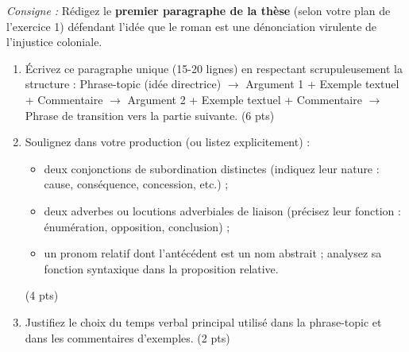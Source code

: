 \documentclass[11pt]{article}
\begin{document}
\begin{exercice}
\emph{Consigne :} Rédigez le \textbf{premier paragraphe de la thèse} (selon votre plan de l'exercice 1) défendant l'idée que le roman est une dénonciation virulente de l'injustice coloniale.

\begin{enumerate}
    \item Écrivez ce paragraphe unique (15-20 lignes) en respectant scrupuleusement la structure : Phrase-topic (idée directrice) $\rightarrow$ Argument 1 + Exemple textuel + Commentaire $\rightarrow$ Argument 2 + Exemple textuel + Commentaire $\rightarrow$ Phrase de transition vers la partie suivante. (6 pts)
    \item Soulignez dans votre production (ou listez explicitement) : 
    \begin{itemize}
        \item deux conjonctions de subordination distinctes (indiquez leur nature : cause, conséquence, concession, etc.) ;
        \item deux adverbes ou locutions adverbiales de liaison (précisez leur fonction : énumération, opposition, conclusion) ;
        \item un pronom relatif dont l'antécédent est un nom abstrait ; analysez sa fonction syntaxique dans la proposition relative.
    \end{itemize}
    (4 pts)
    \item Justifiez le choix du temps verbal principal utilisé dans la phrase-topic et dans les commentaires d'exemples. (2 pts)
\end{enumerate}
\end{exercice}
\end{document}
